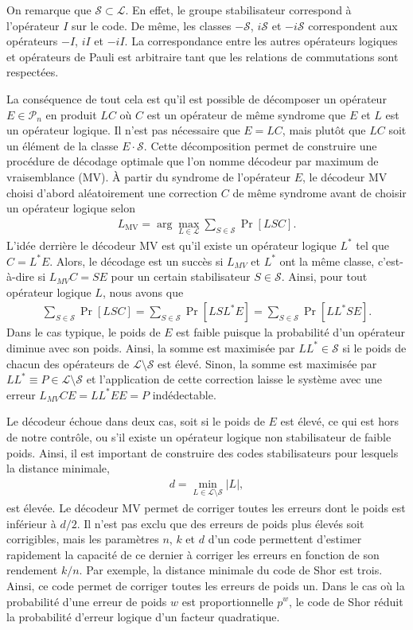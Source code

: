 On remarque que $\mathcal S \subset \mathcal L$.
En effet, le groupe stabilisateur correspond à l'opérateur $I$ sur le code.
De même, les classes $-\mathcal S$, $i\mathcal S$ et $-i\mathcal S$ correspondent
aux opérateurs $-I$, $iI$ et $-iI$.
La correspondance entre les autres opérateurs logiques et opérateurs de Pauli est
arbitraire tant que les relations de commutations sont respectées.

La conséquence de tout cela est qu'il est possible de décomposer un opérateur
$E \in \mathcal P_n$ en produit $LC$ où $C$ est un opérateur de même syndrome que $E$
et $L$ est un opérateur logique.
Il n'est pas nécessaire que $E = LC$, mais plutôt que $LC$ soit un élément de la classe $E \cdot \mathcal S$.
Cette décomposition permet de construire une procédure de décodage optimale que l'on 
nomme décodeur par maximum de vraisemblance (MV).
À partir du syndrome de l'opérateur $E$, 
le décodeur MV choisi d'abord aléatoirement une correction $C$ de même syndrome avant
de choisir un opérateur logique selon
\begin{align}
  L_{\text{MV}} = \arg\max_{L \in \mathcal L} \sum_{S \in \mathcal S} \Pr[LSC].
\end{align}
L'idée derrière le décodeur MV est qu'il existe un opérateur logique $L^*$ tel que $C = L^*E$.
Alors, le décodage est un succès si $L_{MV}$ et $L^*$ ont la même classe,
c'est-à-dire si $L_{MV}C = SE$ pour un certain stabilisateur $S \in \mathcal S$.
Ainsi, pour tout opérateur logique $L$, nous avons que 
\begin{align}
  \sum_{S\in \mathcal S} \Pr[LSC]
  =
  \sum_{S\in \mathcal S} \Pr[LSL^*E]
  =
  \sum_{S\in \mathcal S} \Pr[LL^*SE].
\end{align}
Dans le cas typique,
le poids de $E$ est faible puisque la probabilité d'un opérateur diminue avec son poids.
Ainsi, la somme est maximisée par $LL^* \in \mathcal S$ si le poids de chacun des opérateurs de
$\mathcal L \setminus \mathcal S$ est élevé.
Sinon,
la somme est maximisée par $LL^* \equiv P \in \mathcal L \setminus \mathcal S$ 
et l'application de cette correction laisse le système avec une erreur $L_{MV}CE = LL^*EE = P$ indédectable.

Le décodeur échoue dans deux cas,
soit si le poids de $E$ est élevé, ce qui est hors de notre contrôle,
ou s'il existe un opérateur logique non stabilisateur de faible poids.
Ainsi,
il est important de construire des codes stabilisateurs pour lesquels la distance minimale,
\begin{align}
  d = \min_{L \in \mathcal L \setminus \mathcal S} |L|,
\end{align}
est élevée.
Le décodeur MV permet de corriger toutes les erreurs dont le poids est inférieur à $d / 2$.
Il n'est pas exclu que des erreurs de poids plus élevés soit corrigibles, 
mais les paramètres $n$, $k$ et $d$ d'un code permettent d'estimer rapidement la capacité
de ce dernier à corriger les erreurs en fonction de son rendement $k/n$.
Par exemple,
la distance minimale du code de Shor est trois.
Ainsi, ce code permet de corriger toutes les erreurs de poids un.
Dans le cas où la probabilité d'une erreur de poids $w$ est proportionnelle $p^w$,
le code de Shor réduit la probabilité d'erreur logique d'un facteur quadratique.

